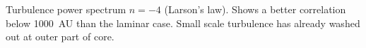 Turbulence power spectrum $n=-4$ (Larson's law). Shows a better correlation below 1000~AU than the laminar case. Small scale turbulence has already washed out at outer part of core.